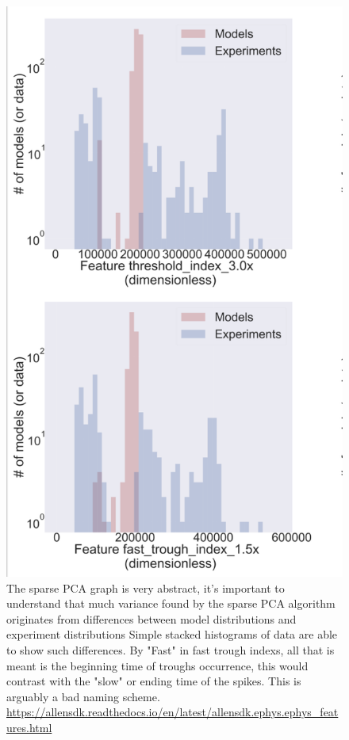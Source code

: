 \begin{figure}
    \centering
    \includegraphics[scale=0.75]{figures/features_that_disagree}
    \caption[Features that disagree. Slow Trough indexs, from the Allen cell types feature extraction]{The sparse PCA graph is very abstract, it's important to understand that much variance found by the sparse PCA algorithm originates from differences between model distributions and experiment distributions Simple stacked histograms of data are able to show such differences. By "Fast" in fast trough indexs, all that is meant is the beginning time of troughs occurrence, this would contrast with the "slow" or ending time of the spikes. This is arguably a bad naming scheme.
    \url{https://allensdk.readthedocs.io/en/latest/allensdk.ephys.ephys_features.html}
    }
        \label{fig:from_poster_disagree}
\end{figure}



